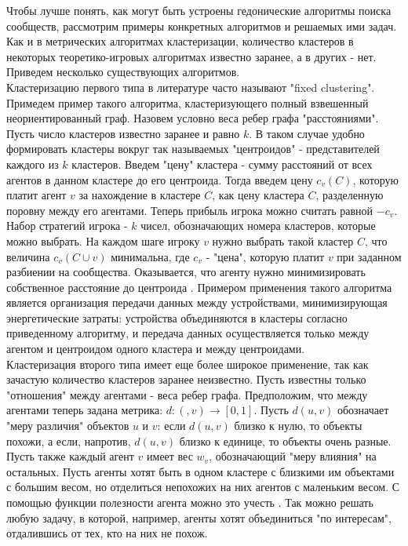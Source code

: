 Чтобы лучше понять, как могут быть устроены гедонические алгоритмы поиска сообществ, рассмотрим примеры конкретных алгоритмов и решаемых ими задач. Как и в метрических алгоритмах кластеризации, количество кластеров в некоторых теоретико-игровых алгоритмах известно заранее, а в других - нет. Приведем несколько существующих алгоритмов.\\

Кластеризацию первого типа в литературе часто называют "fixed clustering". Примедем пример такого алгоритма, кластеризующего полный взвешенный неориентированный граф. Назовем условно веса ребер графа "расстояниями". Пусть число кластеров известно заранее и равно $k$. В таком случае удобно формировать кластеры вокруг так называемых "центроидов" - представителей каждого из $k$ кластеров. Введем "цену" кластера - сумму расстояний от всех агентов в данном кластере до его центроида. Тогда введем цену $c_v(C)$, которую платит агент $v$ за нахождение в кластере $C$, как цену кластера $C$, разделенную поровну между его агентами. Теперь прибыль игрока можно считать равной $-c_v$. Набор стратегий игрока - $k$ чисел, обозначающих номера кластеров, которые можно выбрать. На каждом шаге игроку $v$ нужно выбрать такой кластер $C$, что величина $c_v(C\cup v)$ минимальна, где $c_v$ - "цена", которую платит $v$ при заданном разбиении на сообщества. Оказывается, что агенту нужно минимизировать собственное расстояние до центроида \cite{clusteringhg}. Примером применения такого алгоритма является организация передачи данных между устройствами, минимизирующая энергетические затраты: устройства объединяются в кластеры согласно приведенному алгоритму, и передача данных осуществляется только между агентом и центроидом одного кластера и между центроидами.\\

Кластеризация второго типа имеет еще более широкое применение, так как зачастую количество кластеров заранее неизвестно. Пусть известны только "отношения" между агентами - веса ребер графа. Предположим, что между агентами теперь задана метрика: $d:(, v)\rightarrow [0,1]$. Пусть $d(u, v)$ обозначает "меру различия" объектов $u$ и $v$: если $d(u, v)$ близко к нулю, то объекты похожи, а если, напротив, $d(u, v)$ близко к единице, то объекты очень разные. Пусть также каждый агент $v$ имеет вес $w_v$, обозначающий "меру влияния" на остальных. Пусть агенты хотят быть в одном кластере с близкими им объектами с большим весом, но отделиться непохожих на них агентов с маленьким весом. С помощью функции полезности агента можно это учесть \cite{clusteringhg}. Так можно решать любую задачу, в которой, например, агенты хотят объединиться "по интересам", отдалившись от тех, кто на них не похож.\\

